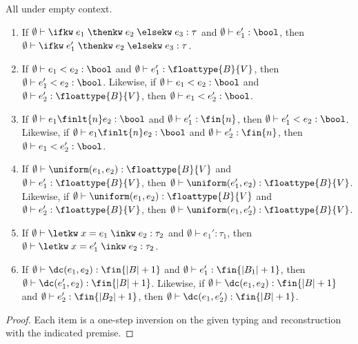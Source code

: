\begin{lemma}\label{lem:typed-replacement}
	All under empty context.
	\begin{enumerate}
		\item If $\emptyset \vdash \ifkw \; e_1 \; \thenkw \; e_2 \; \elsekw \; e_3 : \tau$ and $\emptyset \vdash e_1' : \bool$, then $\emptyset \vdash \ifkw \; e_1' \; \thenkw \; e_2 \; \elsekw \; e_3 : \tau$.
		
		\item If $\emptyset \vdash e_1 < e_2 : \bool$ and $\emptyset \vdash e_1' : \floattype{B}{V}$, then $\emptyset \vdash e_1' < e_2 : \bool$. Likewise, if $\emptyset \vdash e_1 < e_2 : \bool$ and $\emptyset \vdash e_2' : \floattype{B}{V}$, then $\emptyset \vdash e_1 < e_2' : \bool$.
		
		\item If $\emptyset \vdash e_1 \finlt{n} e_2 : \bool$ and $\emptyset \vdash e_1' : \fin{n}$, then $\emptyset \vdash e_1' < e_2 : \bool$. Likewise, if $\emptyset \vdash e_1 \finlt{n} e_2 : \bool$ and $\emptyset \vdash e_2' : \fin{n}$, then $\emptyset \vdash e_1 < e_2' : \bool$.
		
		\item If $\emptyset \vdash \uniform(e_1,e_2) : \floattype{B}{V}$ and $\emptyset \vdash e_1' : \floattype{B}{V}$, then $\emptyset \vdash \uniform(e_1',e_2) : \floattype{B}{V}$. Likewise, if $\emptyset \vdash \uniform(e_1,e_2) : \floattype{B}{V}$ and $\emptyset \vdash e_2' : \floattype{B}{V}$, then $\emptyset \vdash \uniform(e_1,e_2') : \floattype{B}{V}$.
		
		\item If $\emptyset \vdash \letkw \; x = e_1 \; \inkw \; e_2 : \tau_2$ and $\emptyset \vdash e_1' : \tau_1$, then $\emptyset \vdash \letkw \; x = e_1' \; \inkw \; e_2 : \tau_2$.
		
		\item If $\emptyset \vdash \dc(e_1,e_2) : \fin{|B|+1}$ and $\emptyset \vdash e_1' : \fin{|B_1|+1}$, then $\emptyset \vdash \dc(e_1',e_2) : \fin{|B|+1}$. Likewise, if $\emptyset \vdash \dc(e_1,e_2) : \fin{|B|+1}$ and $\emptyset \vdash e_2' : \fin{|B_2|+1}$, then $\emptyset \vdash \dc(e_1,e_2') : \fin{|B|+1}$.
	\end{enumerate}
\end{lemma}

\begin{proof}
	Each item is a one-step inversion on the given typing and reconstruction with the indicated premise.
\end{proof}

